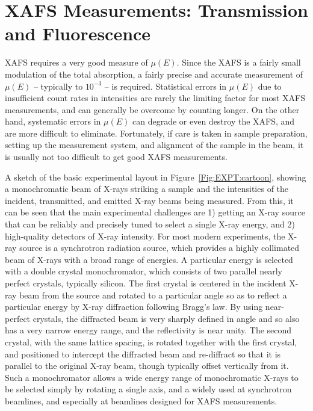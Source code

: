 
\section{XAFS Measurements: Transmission and Fluorescence}

XAFS requires a very good measure of $\mu(E)$.  Since the XAFS is a fairly
small modulation of the total absorption, a fairly precise and accurate
measurement of $\mu(E)$ -- typically to $10^{-3}$ -- is required.
Statistical errors in $\mu(E)$ due to insufficient count rates in
intensities are rarely the limiting factor for most XAFS measurements, and
can generally be overcome by counting longer.  On the other hand,
systematic errors in $\mu(E)$ can degrade or even destroy the XAFS, and are
more difficult to eliminate.  Fortunately, if care is taken in sample
preparation, setting up the measurement system, and alignment of the sample
in the beam, it is usually not too difficult to get good XAFS measurements.

A sketch of the basic experimental layout in Figure~\ref{Fig:EXPT:cartoon},
showing a monochromatic beam of X-rays striking a sample and the
intensities of the incident, transmitted, and emitted X-ray beams being
measured.  From this, it can be seen that the main experimental challenges
are 1) getting an X-ray source that can be reliably and precisely tuned to
select a single X-ray energy, and 2) high-quality detectors of X-ray
intensity.  For most modern experiments, the X-ray source is a synchrotron
radiation source, which provides a highly collimated beam of X-rays with a
broad range of energies.  A particular energy is selected with a double
crystal monochromator, which consists of two parallel nearly perfect
crystals, typically silicon.  The first crystal is centered in the incident
X-ray beam from the source and rotated to a particular angle so as to
reflect a particular energy by X-ray diffraction following Bragg's law.  By
using near-perfect crystals, the diffracted beam is very sharply defined in
angle and so also has a very narrow energy range, and the reflectivity is
near unity.  The second crystal, with the same lattice spacing, is rotated
together with the first crystal, and positioned to intercept the diffracted
beam and re-diffract so that it is parallel to the original X-ray beam,
though typically offset vertically from it.  Such a monochromator allows a
wide energy range of monochromatic X-rays to be selected simply by rotating
a single axis, and a widely used at synchrotron beamlines, and especially
at beamlines designed for XAFS measurements.

